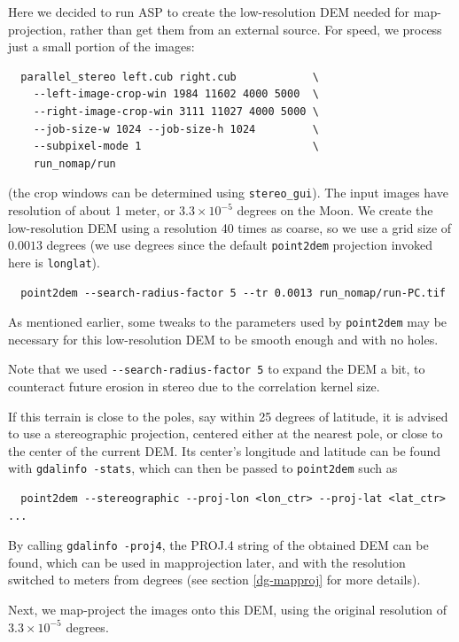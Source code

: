 Here we decided to run ASP to create the low-resolution DEM needed for
map-projection, rather than get them from an external source. For speed,
we process just a small portion of the images:

\begin{verbatim}
  parallel_stereo left.cub right.cub            \
    --left-image-crop-win 1984 11602 4000 5000  \
    --right-image-crop-win 3111 11027 4000 5000 \
    --job-size-w 1024 --job-size-h 1024         \
    --subpixel-mode 1                           \
    run_nomap/run
\end{verbatim}

(the crop windows can be determined using \texttt{stereo\_gui}). 
The input images have resolution of about 1 meter, or $3.3 \times
10^{-5}$ degrees on the Moon. We create the low-resolution DEM using a
resolution 40 times as coarse, so we use a grid size of $0.0013$ degrees
(we use degrees since the default \texttt{point2dem} projection invoked
here is \texttt{longlat}).

\begin{verbatim}
  point2dem --search-radius-factor 5 --tr 0.0013 run_nomap/run-PC.tif 
\end{verbatim}

As mentioned earlier, some tweaks to the parameters used by \texttt{point2dem}
may be necessary for this low-resolution DEM to be smooth enough and
with no holes.

Note that we used \texttt{-\/-search-radius-factor 5} to expand the DEM
a bit, to counteract future erosion in stereo due to the correlation kernel
size.

If this terrain is close to the poles, say within 25 degrees of
latitude, it is advised to use a stereographic projection, centered
either at the nearest pole, or close to the center of the current
DEM. Its center's longitude and latitude can be found with
\texttt{gdalinfo -stats}, which can then be passed to \texttt{point2dem}
such as

\begin{verbatim}
  point2dem --stereographic --proj-lon <lon_ctr> --proj-lat <lat_ctr> ...
\end{verbatim}

By calling \texttt{gdalinfo -proj4}, the PROJ.4 string of the obtained DEM can
be found, which can be used in mapprojection later, and with the resolution
switched to meters from degrees (see section \ref{dg-mapproj} for more details). 

Next, we map-project the images onto this DEM, using the original resolution
of $3.3 \times 10^{-5}$ degrees.

